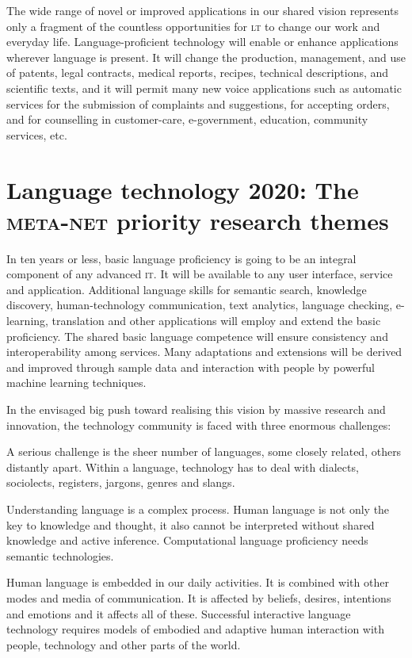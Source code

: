 \documentclass[output=paper]{LSP/langsci}
\begin{document}
The wide range of novel or improved applications in our shared vision
represents only a fragment of the countless opportunities for \textsc{lt} to
change our work and everyday life. Language-proficient technology will
enable or enhance applications wherever language is present. It will
change the production, management, and use of patents, legal
contracts, medical reports, recipes, technical descriptions, and
scientific texts, and it will permit many new voice applications such
as automatic services for the submission of complaints and
suggestions, for accepting orders, and for counselling in
customer-care, e-government, education, community services, etc.

\section{Language technology 2020: The \textsc{meta-net} priority research themes}
\label{sec:lang-techn-2020-pts}

In ten years or less, basic language proficiency is going to be an
integral component of any advanced \textsc{it}. It will be available to any
user interface, service and application. Additional language skills
for semantic search, knowledge discovery, human-technology
communication, text analytics, language checking, e-learning,
translation and other applications will employ and extend the basic
proficiency. The shared basic language competence will ensure
consistency and interoperability among services. Many adaptations and
extensions will be derived and improved through sample data and
interaction with people by powerful machine learning techniques.

In the envisaged big push toward realising this vision by massive
research and innovation, the technology community is faced with three
enormous challenges:

\begin{description}
\sloppy
\item[Richness and diversity.] A serious challenge is the sheer
  number of languages, some closely related, others distantly
  apart. Within a language, technology has to deal with dialects,
  sociolects, registers, jargons, genres and slangs.
\item[Depth and meaning.] Understanding language is a complex
  process. Human language is not only the key to knowledge and
  thought, it also cannot be interpreted without shared knowledge and
  active inference. Computational language proficiency needs semantic
  technologies.
\item[Multimodality and grounding.] Human language is embedded
  in our daily activities. It is combined with other modes and media
  of communication. It is affected by beliefs, desires, intentions and
  emotions and it affects all of these. Successful interactive
  language technology requires models of embodied and adaptive human
  interaction with people, technology and other parts of the world.
\end{description}
 
\end{document}

